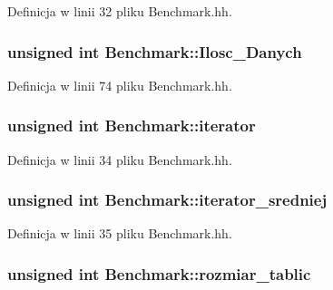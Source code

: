 Definicja w linii 32 pliku Benchmark.hh.

\hypertarget{class_benchmark_a5f29a9983dd88241a17c4a9b2a86e9e1}{
\subsubsection[{Ilosc\_\-Danych}]{\setlength{\rightskip}{0pt plus 5cm}unsigned int {\bf Benchmark::Ilosc\_\-Danych}}}
\label{class_benchmark_a5f29a9983dd88241a17c4a9b2a86e9e1}


Definicja w linii 74 pliku Benchmark.hh.

\hypertarget{class_benchmark_ae1cbaa987a9ac13bc40dbe4b84a587b6}{
\subsubsection[{iterator}]{\setlength{\rightskip}{0pt plus 5cm}unsigned int {\bf Benchmark::iterator}}}
\label{class_benchmark_ae1cbaa987a9ac13bc40dbe4b84a587b6}


Definicja w linii 34 pliku Benchmark.hh.

\hypertarget{class_benchmark_a12925bcca68de983919ebd5d6b9e2b01}{
\subsubsection[{iterator\_\-sredniej}]{\setlength{\rightskip}{0pt plus 5cm}unsigned int {\bf Benchmark::iterator\_\-sredniej}}}
\label{class_benchmark_a12925bcca68de983919ebd5d6b9e2b01}


Definicja w linii 35 pliku Benchmark.hh.

\hypertarget{class_benchmark_a30d4c478ec859f45df0ac80ac1a89203}{
\subsubsection[{rozmiar\_\-tablic}]{\setlength{\rightskip}{0pt plus 5cm}unsigned int {\bf Benchmark::rozmiar\_\-tablic}}}
\label{class_benchmark_a30d4c478ec859f45df0ac80ac1a89203}


